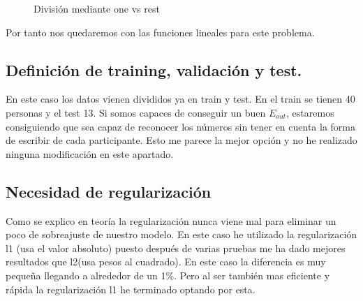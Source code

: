 \documentclass[titlepage]{article}
\begin{document}
\begin{figure}[H]
	\centering
	\caption{División mediante one vs rest}
\end{figure}

Por tanto nos quedaremos con las funciones lineales para este problema.
 
\subsection{Definición de training, validación y test.}
En este caso los datos vienen divididos ya en train y test. En el train se tienen 40 personas y el test 13. Si somos capaces de conseguir un buen $E_{out}$, estaremos consiguiendo que sea capaz de reconocer los números sin tener en cuenta la forma de escribir de cada participante. Esto me parece la mejor opción y no he realizado ninguna modificación en este apartado.

\subsection{Necesidad de regularización}
Como se explico en teoría la regularización nunca viene mal para eliminar un poco de sobreajuste de nuestro modelo. En este caso he utilizado la regularización l1 (usa el valor absoluto) puesto después de varias pruebas me ha dado mejores resultados que l2(usa pesos al cuadrado). En este caso la diferencia es muy pequeña llegando a alrededor de un 1\%. Pero al ser también mas eficiente y rápida la regularización l1 he terminado optando por esta.
\end{document}
